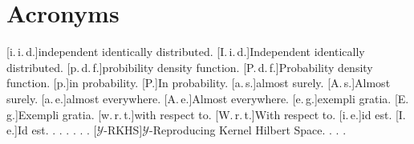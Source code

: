 %



\chapter*{Acronyms}

\begin{acronym}[vv-RKHS]
[i.\,i.\,d.]{in\-de\-pen\-dent iden\-ti\-cal\-ly dis\-tri\-bu\-ted}.
[I.\,i.\,d.]{In\-de\-pen\-dent iden\-ti\-cal\-ly dis\-tri\-bu\-ted}.
[p.\,d.\,f.]{pro\-bi\-bi\-li\-ty den\-si\-ty func\-tion}.
[P.\,d.\,f.]{Pro\-ba\-bi\-li\-ty den\-si\-ty func\-tion}.
[p.]{in pro\-ba\-bi\-li\-ty}.
[P.]{In pro\-ba\-bi\-li\-ty}.
[a.\,s.]{al\-most su\-re\-ly}.
[A.\,s.]{Al\-most su\-re\-ly}.
[a.\,e.]{al\-most eve\-ry\-where}.
[A.\,e.]{Al\-most eve\-ry\-where}.
[e.\,g.]{ex\-em\-pli gra\-tia}.
[E.\,g.]{Ex\-em\-pli gra\-tia}.
[w.\,r.\,t.]{with res\-pect to}.
[W.\,r.\,t.]{With res\-pect to}.
[i.\,e.]{id est}.
[I.\,e.]{Id est}.
.
.
.
.
.
.
[\texorpdfstring{$\mathcal{Y}$}--RKHS]{\texorpdfstring{$\mathcal{Y}$}--Re\-pro\-du\-cing Ker\-nel Hil\-bert Spa\-ce}.
.
.
.
\end{acronym}

\endgroup
